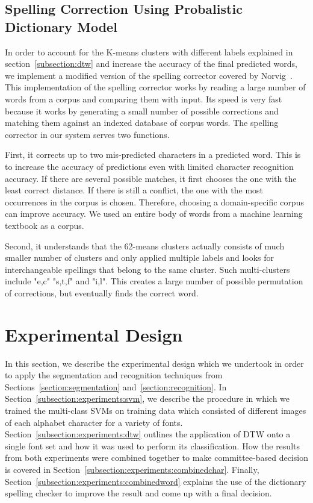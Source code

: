 \documentclass[12pt]{article}
\begin{document}
	\subsection{Spelling Correction Using Probalistic Dictionary Model}
	\label{subsection:spellingcheck}
	
	In order to account for the K-means clusters with different labels explained in section~\ref{subsection:dtw} and increase the accuracy of the final predicted words, we implement a modified version of the spelling corrector covered by Norvig~\cite{norvig}. This implementation of the spelling corrector works by reading a large number of words from a corpus and comparing them with input. Its speed is very fast because it works by generating a small number of possible corrections and matching them against an indexed database of corpus words. The spelling corrector in our system serves two functions.
	
	First, it corrects up to two mis-predicted characters in a predicted word. This is to increase the accuracy of predictions even with limited character recognition accuracy. If there are several possible matches, it first chooses the one with the least correct distance. If there is still a conflict, the one with the most occurrences in the corpus is chosen. Therefore, choosing a domain-specific corpus can improve accuracy. We used an entire body of words from a machine learning textbook as a corpus.
	
	Second, it understands that the 62-means clusters actually consists of much smaller number of clusters and only applied multiple labels and looks for interchangeable spellings that belong to the same cluster. Such multi-clusters include "e,c" "s,t,f" and "i,l". This creates a large number of possible permutation of corrections, but eventually finds the correct word.	
	
\section{Experimental Design}
\label{section:experiments}
In this section, we describe the experimental design which we undertook in order to apply the segmentation and recognition techniques from Sections~\ref{section:segmentation} and~\ref{section:recognition}. In Section~\ref{subsection:experiments:svm}, we describe the procedure in which we trained the multi-class SVMs on training data which consisted of different images of each alphabet character for a variety of fonts. Section~\ref{subsection:experiments:dtw} outlines the application of DTW onto a single font set and how it was used to perform its classification. How the results from both experiments were combined together to make committee-based decision is covered in Section~\ref{subsection:experiments:combinedchar}. Finally, Section~\ref{subsection:experiments:combinedword} explains the use of the dictionary spelling checker to improve the result and come up with a final decision.
	
\end{document}
